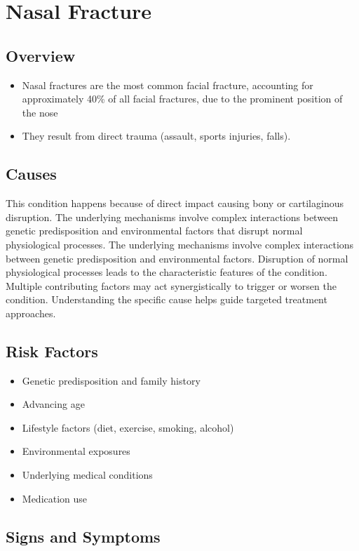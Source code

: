 \chapter{Nasal Fracture}
\label{sec:Nasal Fracture}

\section{Overview}


\begin{itemize}[noitemsep]
  \item Nasal fractures are the most common facial fracture, accounting for approximately 40\% of all facial fractures, due to the prominent position of the nose
  \item They result from direct trauma (assault, sports injuries, falls).
\end{itemize}
\section{Causes}
This condition happens because of direct impact causing bony or cartilaginous disruption. The underlying mechanisms involve complex interactions between genetic predisposition and environmental factors that disrupt normal physiological processes. The underlying mechanisms involve complex interactions between genetic predisposition and environmental factors. Disruption of normal physiological processes leads to the characteristic features of the condition. Multiple contributing factors may act synergistically to trigger or worsen the condition. Understanding the specific cause helps guide targeted treatment approaches.
\section{Risk Factors}


\begin{itemize}[noitemsep]
  \item Genetic predisposition and family history
  \item Advancing age
  \item Lifestyle factors (diet, exercise, smoking, alcohol)
  \item Environmental exposures
  \item Underlying medical conditions
  \item Medication use
\end{itemize}
\section{Signs and Symptoms}

